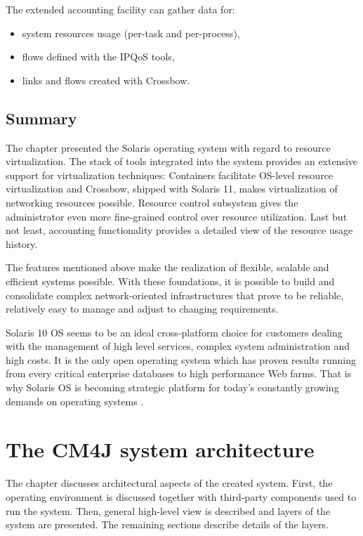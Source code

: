 \documentclass[11pt,openany]{book}
\begin{document}
        The extended accounting facility can gather data for:

        \begin{itemize}
          \item system resources usage (per-task and per-process),
          \item flows defined with the IPQoS tools,
          \item links and flows created with Crossbow.
        \end{itemize}


    \section*{Summary}

      The chapter presented the Solaris operating system with regard to resource virtualization. The stack of tools
      integrated into the system provides an extensive support for virtualization techniques: Containers facilitate
      OS-level resource virtualization and Crossbow, shipped with Solaris 11, makes virtualization of networking
      resources possible. Resource control subsystem gives the administrator even more fine-grained control over
      resource utilization. Last but not least, accounting functionality provides a detailed view of the resource usage
      history.

      The features mentioned above make the realization of flexible, scalable and efficient systems possible. With these
      foundations, it is possible to build and consolidate complex network-oriented infrastructures that prove to be
      reliable, relatively easy to manage and adjust to changing requirements.

      Solaris 10 OS seems to be an ideal cross-platform choice for customers dealing with the management of high level
      services, complex system administration and high costs. It is the only open operating system which has proven
      results running from every critical enterprise databases to high performance Web farms. That is why Solaris OS is
      becoming strategic platform for today's constantly growing demands on operating systems
      \cite{solaris_operating_system}. 


  \chapter{The CM4J system architecture}
  \label{chap:arch}

    The chapter discusses architectural aspects of the created system. First, the operating environment is discussed
    together with third-party components used to run the system. Then, general high-level view is described and
    layers of the system are presented. The remaining sections describe details of the layers.
\end{document}
